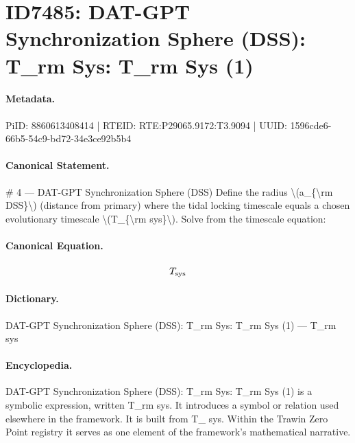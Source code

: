 \section*{ID7485: DAT-GPT Synchronization Sphere (DSS): T\_rm Sys: T\_rm Sys (1)}
\paragraph{Metadata.}
PiID: 8860613408414 | RTEID: RTE:P29065.9172:T3.9094 | UUID: 1596cde6-66b5-54c9-bd72-34e3ce92b5b4

\paragraph{Canonical Statement.}
\# 4 — DAT-GPT Synchronization Sphere (DSS) Define the radius \textbackslash{}(a\_\{\textbackslash{}rm DSS\}\textbackslash{}) (distance from primary) where the tidal locking timescale equals a chosen evolutionary timescale \textbackslash{}(T\_\{\textbackslash{}rm sys\}\textbackslash{}). Solve from the timescale equation:

\paragraph{Canonical Equation.}
\[
T_{\rm sys}
\]

\paragraph{Dictionary.}
DAT-GPT Synchronization Sphere (DSS): T\_rm Sys: T\_rm Sys (1) — T\_rm sys

\paragraph{Encyclopedia.}
DAT-GPT Synchronization Sphere (DSS): T\_rm Sys: T\_rm Sys (1) is a symbolic expression, written T\_rm sys. It introduces a symbol or relation used elsewhere in the framework. It is built from T\_ sys. Within the Trawin Zero Point registry it serves as one element of the framework's mathematical narrative.
